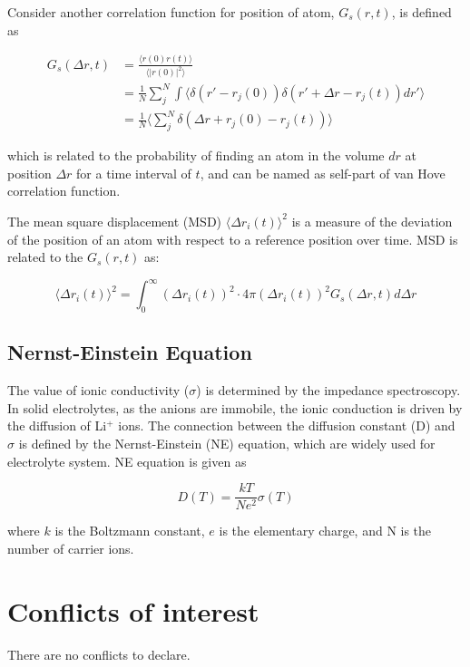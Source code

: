 \documentclass[twoside,twocolumn,9pt]{article}
\begin{document}
Consider another correlation function for position of atom, $G_s(r,t)$, is defined as

\begin{align*}
G_s(\Delta r,t)&=\frac{\langle r(0)r(t)\rangle}{\langle | r(0)|^2 \rangle} \\
        &=\frac{1}{N}\sum_{j}^{N}\int \langle \delta(r'-r_j(0))\delta(r'+\Delta r -r_j(t))dr' \rangle \\
        &=\frac{1}{N}\langle \sum_{j}^{N}\delta(\Delta r +r_j(0)-r_j(t))\rangle
\end{align*}

which is related to the probability of finding an atom in the volume $dr$ at position $\Delta r$ for a time interval of $t$,
and can be named as self-part of van Hove correlation function.

The mean square displacement (MSD) $\langle \Delta r_i(t)\rangle ^2$  is a measure of the deviation of the position of an atom with
respect to a reference position over time. MSD is related to the $G_s(r,t)$ as:

\begin{equation}
  \langle \Delta r_i(t)\rangle ^2=\int_{0}^{\infty} (\Delta r_i(t))^2\cdot 4\pi(\Delta r_i(t))^2G_s(\Delta r,t)d\Delta r
\end{equation}

\subsection{ Nernst-Einstein  Equation}

The value of ionic conductivity ($\sigma$) is determined by the impedance spectroscopy.
In solid electrolytes, as the anions are immobile, the ionic conduction is driven by the diffusion of Li$^+$ ions. 
The connection between the diffusion constant (D) and $\sigma$ is defined by the Nernst-Einstein (NE) equation, 
which are widely used for electrolyte system. NE equation is given as

\begin{equation}
D(T)=\frac{kT}{Ne^2}\sigma(T)
\end{equation}

where $k$ is the Boltzmann constant, $e$ is the elementary charge, and N is the number of carrier ions.
 
\section*{Conflicts of interest}
There are no conflicts to declare.
\end{document}
